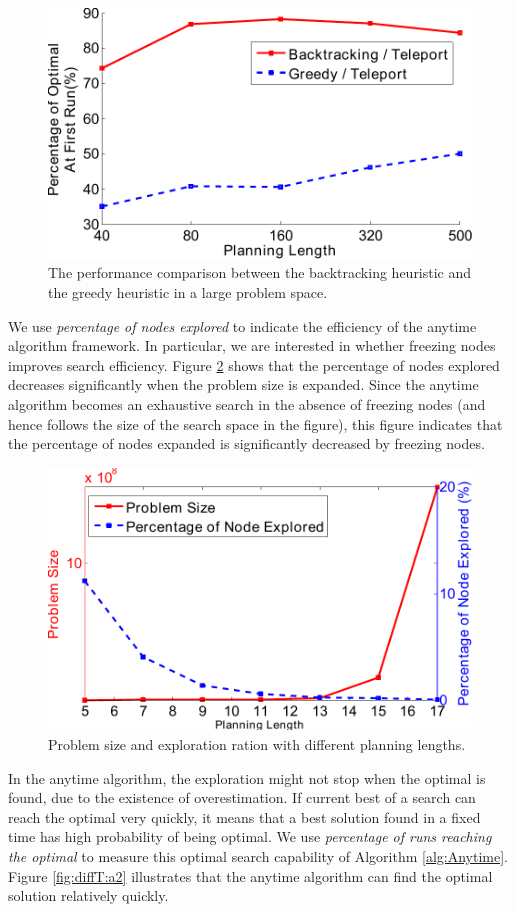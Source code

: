 \begin{figure}
\centering
\includegraphics[width=0.7\linewidth]{./images/largeprob}
\caption{The performance comparison between the backtracking heuristic and the greedy heuristic in a large problem space.}
\label{fig:largeprob}
\end{figure}

We use \emph{percentage of nodes explored} to indicate the efficiency of the anytime algorithm framework.
In particular, we are interested in whether freezing nodes improves search efficiency.
Figure \ref{fig:diffT:a1} shows that the percentage of nodes explored decreases significantly when the problem size is expanded.
Since the anytime algorithm becomes an exhaustive search in the absence of freezing nodes (and hence follows the size of the search space in the figure), this figure indicates that the percentage of nodes expanded is significantly decreased by freezing nodes.
\begin{figure}
\centering
\includegraphics[width=0.7\linewidth]{./images/T_ProbSize_ExpRatio.pdf}
\caption{Problem size and exploration ration with different planning lengths.}
\label{fig:diffT:a1}
\end{figure}
In the anytime algorithm, the exploration might not stop when the optimal is found, due to the existence of overestimation.
If current best of a search can reach the optimal very quickly, it means that a best solution found in a fixed time has high probability of being optimal.
We use \emph{percentage of runs reaching the optimal} to measure this optimal search capability of Algorithm \ref{alg:Anytime}.
Figure \ref{fig:diffT:a2} illustrates that the anytime algorithm can find the optimal solution relatively quickly.

